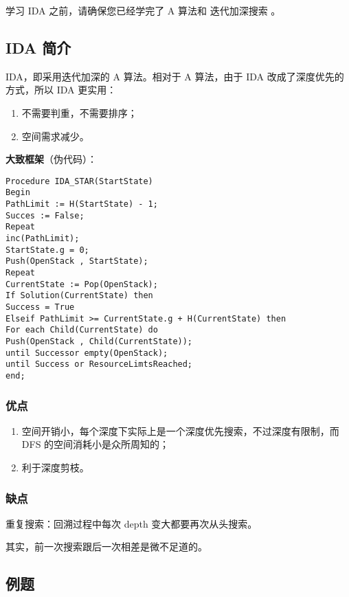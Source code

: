 
学习 IDA 之前，请确保您已经学完了  A  算法和  迭代加深搜索  。

\subsection{IDA 简介}

IDA，即采用迭代加深的 A 算法。相对于 A 算法，由于 IDA 改成了深度优先的方式，所以 IDA 更实用：

\begin{enumerate}
\item 不需要判重，不需要排序；
\item 空间需求减少。
\end{enumerate}

\textbf{大致框架}（伪代码）：

\begin{verbatim}
Procedure IDA_STAR(StartState)
Begin
PathLimit := H(StartState) - 1;
Succes := False;
Repeat
inc(PathLimit);
StartState.g = 0;
Push(OpenStack , StartState);
Repeat
CurrentState := Pop(OpenStack);
If Solution(CurrentState) then
Success = True
Elseif PathLimit >= CurrentState.g + H(CurrentState) then
For each Child(CurrentState) do
Push(OpenStack , Child(CurrentState));
until Successor empty(OpenStack);
until Success or ResourceLimtsReached;
end;
\end{verbatim}

\subsubsection{优点}

\begin{enumerate}
\item 空间开销小，每个深度下实际上是一个深度优先搜索，不过深度有限制，而 DFS 的空间消耗小是众所周知的；
\item 利于深度剪枝。
\end{enumerate}

\subsubsection{缺点}

重复搜索：回溯过程中每次 depth 变大都要再次从头搜索。

\begin{QUOTE}{}{}
其实，前一次搜索跟后一次相差是微不足道的。
\end{QUOTE}

\subsection{例题}

